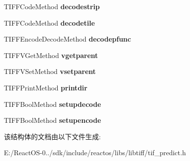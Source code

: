 \begin{DoxyCompactItemize}
\item 
\mbox{\label{struct_t_i_f_f_predictor_state_a8c1508ab63c605f839ff04553614f82d}} 
T\+I\+F\+F\+Code\+Method {\bfseries decodestrip}
\item 
\mbox{\label{struct_t_i_f_f_predictor_state_a958ea7b5e2761604207ffdbe10579bbf}} 
T\+I\+F\+F\+Code\+Method {\bfseries decodetile}
\item 
\mbox{\label{struct_t_i_f_f_predictor_state_a0f28adc6f085bcd85b4b78ca4db7417f}} 
T\+I\+F\+F\+Encode\+Decode\+Method {\bfseries decodepfunc}
\item 
\mbox{\label{struct_t_i_f_f_predictor_state_a57f73dc9c11293dcf8b33609bc54dab5}} 
T\+I\+F\+F\+V\+Get\+Method {\bfseries vgetparent}
\item 
\mbox{\label{struct_t_i_f_f_predictor_state_a3b7c2bdd1b27f85a72d57b7bed1c5979}} 
T\+I\+F\+F\+V\+Set\+Method {\bfseries vsetparent}
\item 
\mbox{\label{struct_t_i_f_f_predictor_state_aa9e9d1bc486f65107308616a5b55e461}} 
T\+I\+F\+F\+Print\+Method {\bfseries printdir}
\item 
\mbox{\label{struct_t_i_f_f_predictor_state_ab8d9e203e60c00e19b447cbd159d7620}} 
T\+I\+F\+F\+Bool\+Method {\bfseries setupdecode}
\item 
\mbox{\label{struct_t_i_f_f_predictor_state_abf12b6232c1a524cb3c9a439715408a4}} 
T\+I\+F\+F\+Bool\+Method {\bfseries setupencode}
\end{DoxyCompactItemize}


该结构体的文档由以下文件生成\+:\begin{DoxyCompactItemize}
\item 
E\+:/\+React\+O\+S-\/0../sdk/include/reactos/libs/libtiff/tif\+\_\+predict.\+h\end{DoxyCompactItemize}
